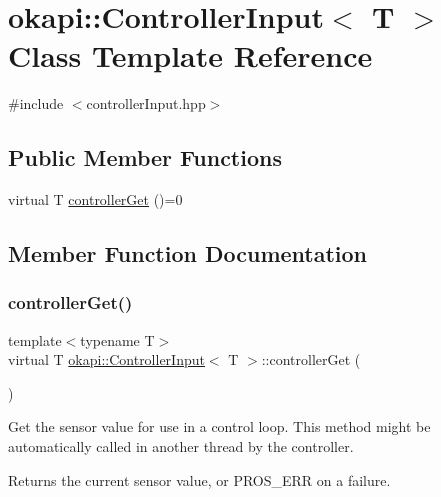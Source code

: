 \hypertarget{classokapi_1_1ControllerInput}{}\section{okapi\+::Controller\+Input$<$ T $>$ Class Template Reference}
\label{classokapi_1_1ControllerInput}


{\ttfamily \#include $<$controller\+Input.\+hpp$>$}

\subsection*{Public Member Functions}
\begin{DoxyCompactItemize}
\item 
virtual T \mbox{\hyperlink{classokapi_1_1ControllerInput_a3c6c86d897983f367928a93890551e17}{controller\+Get}} ()=0
\end{DoxyCompactItemize}


\subsection{Member Function Documentation}
\mbox{\label{classokapi_1_1ControllerInput_a3c6c86d897983f367928a93890551e17}} 
\subsubsection{\texorpdfstring{controllerGet()}{controllerGet()}}
{\footnotesize\ttfamily template$<$typename T$>$ \\
virtual T \mbox{\hyperlink{classokapi_1_1ControllerInput}{okapi\+::\+Controller\+Input}}$<$ T $>$\+::controller\+Get (\begin{DoxyParamCaption}{ }\end{DoxyParamCaption})\hspace{0.3cm}{\ttfamily [pure virtual]}}

Get the sensor value for use in a control loop. This method might be automatically called in another thread by the controller.

\begin{DoxyReturn}{Returns}
the current sensor value, or {\ttfamily P\+R\+O\+S\+\_\+\+E\+RR} on a failure. 
\end{DoxyReturn}


